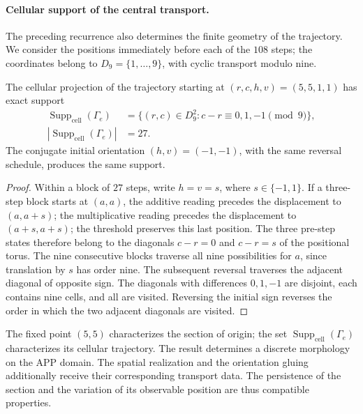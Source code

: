 \paragraph{Cellular support of the central transport.}
The preceding recurrence also determines the finite geometry of the
trajectory. We consider the positions immediately before each
of the \(108\) steps; the coordinates belong to
\(D_9=\{1,\ldots,9\}\), with cyclic transport modulo nine.

\begin{proposition}
\label{prop:el-soporte-27}
The cellular projection of the trajectory starting at
\((r,c,h,v)=(5,5,1,1)\) has exact support
\begin{equation}
 \begin{aligned}
 \operatorname{Supp}_{\mathrm{cell}}(\Gamma_e)&=\{(r,c)\in D_9^2:
                 c-r\equiv0,1,-1\pmod9\},
 \\
 |\operatorname{Supp}_{\mathrm{cell}}(\Gamma_e)|&=27.
 \end{aligned}
 \label{eq:el-soporte-27}
\end{equation}
The conjugate initial orientation \((h,v)=(-1,-1)\), with the same
reversal schedule, produces the same support.
\end{proposition}
\begin{proof}
Within a block of \(27\) steps, write \(h=v=s\), where
\(s\in\{-1,1\}\). If a three-step block starts at \((a,a)\),
the additive reading precedes the displacement to \((a,a+s)\);
the multiplicative reading precedes the displacement to
\((a+s,a+s)\); the threshold preserves this last position. The three
pre-step states therefore belong to the diagonals
\(c-r=0\) and \(c-r=s\) of the positional torus. The nine
consecutive blocks traverse all nine possibilities for \(a\), since
translation by \(s\) has order nine. The subsequent reversal
traverses the adjacent diagonal of opposite sign. The diagonals
with differences \(0,1,-1\) are disjoint, each contains nine
cells, and all are visited. Reversing the initial sign
reverses the order in which the two adjacent diagonals are visited.
\end{proof}

The fixed point \((5,5)\) characterizes the section of origin; the set
\(\operatorname{Supp}_{\mathrm{cell}}(\Gamma_e)\) characterizes its cellular trajectory. The result
determines a discrete morphology on the APP domain. The spatial
realization and the orientation gluing additionally receive their
corresponding transport data. The persistence of the section and the
variation of its observable position are thus compatible properties.


